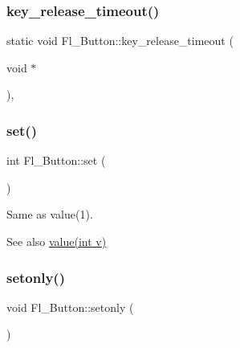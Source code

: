 \mbox{\label{class_fl___button_a63a541cac3d2eccadfc65e81a5117c40}} 
\subsubsection{\texorpdfstring{key\+\_\+release\+\_\+timeout()}{key\_release\_timeout()}}
{\footnotesize\ttfamily static void Fl\+\_\+\+Button\+::key\+\_\+release\+\_\+timeout (\begin{DoxyParamCaption}\item[{void $\ast$}]{ }\end{DoxyParamCaption})\hspace{0.3cm}{\ttfamily [static]}, {\ttfamily [protected]}}

\mbox{\label{class_fl___button_aa6dfe6b7a8e12b804f90726586fe87d4}} 
\subsubsection{\texorpdfstring{set()}{set()}}
{\footnotesize\ttfamily int Fl\+\_\+\+Button\+::set (\begin{DoxyParamCaption}{ }\end{DoxyParamCaption})\hspace{0.3cm}{\ttfamily [inline]}}

Same as {\ttfamily value(1)}. \begin{DoxySeeAlso}{See also}
\hyperlink{class_fl___button_aceffc03f6b14f180a1639e26c91f9a4a}{value(int v)} 
\end{DoxySeeAlso}
\mbox{\label{class_fl___button_ad56f03bef37bd9d2a8a115188da3149d}} 
\subsubsection{\texorpdfstring{setonly()}{setonly()}}
{\footnotesize\ttfamily void Fl\+\_\+\+Button\+::setonly (\begin{DoxyParamCaption}{ }\end{DoxyParamCaption})}

